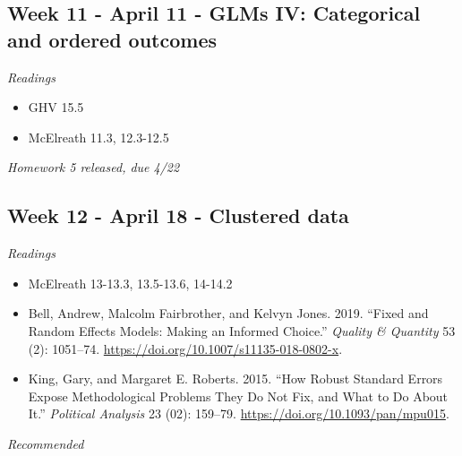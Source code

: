 \documentclass[
  10pt,
]{article}
\providecommand{\tightlist}{%
  \setlength{\itemsep}{0pt}\setlength{\parskip}{0pt}}
\begin{document}
\hypertarget{week-11---april-11---glms-iv-categorical-and-ordered-outcomes}{%
\subsection{Week 11 - April 11 - GLMs IV: Categorical and ordered
outcomes}\label{week-11---april-11---glms-iv-categorical-and-ordered-outcomes}}

\emph{Readings}

\begin{itemize}
\tightlist
\item
  GHV 15.5
\item
  McElreath 11.3, 12.3-12.5
\end{itemize}

\emph{Homework 5 released, due 4/22}

\hypertarget{week-12---april-18---clustered-data}{%
\subsection{Week 12 - April 18 - Clustered
data}\label{week-12---april-18---clustered-data}}

\emph{Readings}

\begin{itemize}
\tightlist
\item
  McElreath 13-13.3, 13.5-13.6, 14-14.2
\item
  Bell, Andrew, Malcolm Fairbrother, and Kelvyn Jones. 2019. ``Fixed and
  Random Effects Models: Making an Informed Choice.'' \emph{Quality \&
  Quantity} 53 (2): 1051--74.
  \url{https://doi.org/10.1007/s11135-018-0802-x}.
\item
  King, Gary, and Margaret E. Roberts. 2015. ``How Robust Standard
  Errors Expose Methodological Problems They Do Not Fix, and What to Do
  About It.'' \emph{Political Analysis} 23 (02): 159--79.
  \url{https://doi.org/10.1093/pan/mpu015}.
\end{itemize}

\emph{Recommended}
\end{document}

